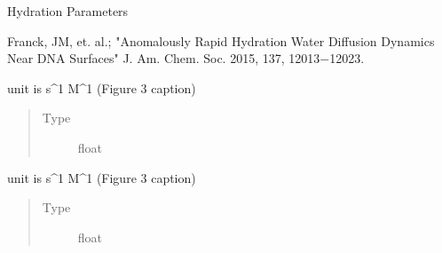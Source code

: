 \documentclass[letterpaper,10pt,english]{sphinxmanual}
\begin{document}
\begin{fulllineitems}
\label{\detokenize{dnpHydration:dnpLab.dnpHydration.HydrationParameter}}
Hydration Parameters

Franck, JM, et. al.; "Anomalously Rapid Hydration Water Diffusion Dynamics Near DNA Surfaces" J. Am. Chem. Soc. 2015, 137, 12013−12023.

\begin{fulllineitems}
\label{\detokenize{dnpHydration:dnpLab.dnpHydration.HydrationParameter.ksigma_bulk}}
unit is s\textasciicircum{}\sphinxhyphen{}1 M\textasciicircum{}\sphinxhyphen{}1 (Figure 3 caption)
\begin{quote}\begin{description}
\item[{Type}] \leavevmode
float

\end{description}\end{quote}

\end{fulllineitems}


\begin{fulllineitems}
\label{\detokenize{dnpHydration:dnpLab.dnpHydration.HydrationParameter.klow_bulk}}
unit is s\textasciicircum{}\sphinxhyphen{}1 M\textasciicircum{}\sphinxhyphen{}1 (Figure 3 caption)
\begin{quote}\begin{description}
\item[{Type}] \leavevmode
float

\end{description}\end{quote}

\end{fulllineitems}



\end{fulllineitems}
\end{document}
